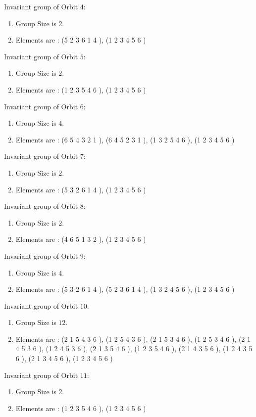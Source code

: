 \documentclass[12pt]{article}
\begin{document}
Invariant group of Orbit $4$:
\begin{enumerate}
\item Group Size is $2$.
\item Elements are : (5 2 3 6 1 4  ), (1 2 3 4 5 6  )
\end{enumerate}
Invariant group of Orbit $5$:
\begin{enumerate}
\item Group Size is $2$.
\item Elements are : (1 2 3 5 4 6  ), (1 2 3 4 5 6  )
\end{enumerate}
Invariant group of Orbit $6$:
\begin{enumerate}
\item Group Size is $4$.
\item Elements are : (6 5 4 3 2 1  ), (6 4 5 2 3 1  ), (1 3 2 5 4 6  ), (1 2 3 4 5 6  )
\end{enumerate}
Invariant group of Orbit $7$:
\begin{enumerate}
\item Group Size is $2$.
\item Elements are : (5 3 2 6 1 4  ), (1 2 3 4 5 6  )
\end{enumerate}
Invariant group of Orbit $8$:
\begin{enumerate}
\item Group Size is $2$.
\item Elements are : (4 6 5 1 3 2  ), (1 2 3 4 5 6  )
\end{enumerate}
Invariant group of Orbit $9$:
\begin{enumerate}
\item Group Size is $4$.
\item Elements are : (5 3 2 6 1 4  ), (5 2 3 6 1 4  ), (1 3 2 4 5 6  ), (1 2 3 4 5 6  )
\end{enumerate}
Invariant group of Orbit $10$:
\begin{enumerate}
\item Group Size is $12$.
\item Elements are : (2 1 5 4 3 6  ), (1 2 5 4 3 6  ), (2 1 5 3 4 6  ), (1 2 5 3 4 6  ), (2 1 4 5 3 6  ), (1 2 4 5 3 6  ), (2 1 3 5 4 6  ), (1 2 3 5 4 6  ), (2 1 4 3 5 6  ), (1 2 4 3 5 6  ), (2 1 3 4 5 6  ), (1 2 3 4 5 6  )
\end{enumerate}
Invariant group of Orbit $11$:
\begin{enumerate}
\item Group Size is $2$.
\item Elements are : (1 2 3 5 4 6  ), (1 2 3 4 5 6  )
\end{enumerate}
\end{document}
